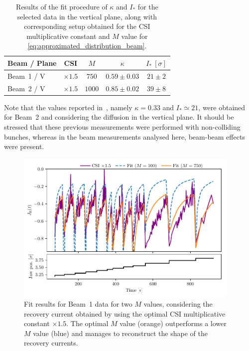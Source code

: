 %
\begin{table}[thp]
    \centering
    \begin{tabular}{lcccc}
        \toprule
        Beam / Plane & CSI & $M$ & $\kappa$ & $I_\ast\ [\sigma]$ \\
        \midrule
        Beam~1 / V & $\times1.5$ & $750$ & $0.59\pm0.03$ & $21\pm2$ \\
        Beam~2 / V & $\times1.5$ & $1000$ & $0.85\pm0.02$ & $39\pm8$ \\
        \bottomrule
    \end{tabular}
    \caption{Results of the fit procedure of $\kappa$ and $I_\ast$ for the selected data in the vertical plane, along with corresponding setup obtained for the CSI multiplicative constant and $M$ value for \eqref{eq:approximated_distribution_beam}.}
    \label{tab:fit_results}
\end{table}
%

Note that the values reported in~\cite{bazzani2020diffusion}, namely $\kappa=0.33 $ and $I_\ast \simeq 21$, were obtained for Beam~2 and considering the diffusion in the vertical plane. It should be stressed that these previous measurements were performed with non-colliding bunches, whereas in the beam measurements analysed here, beam-beam effects were present.

\begin{figure}[t]
    \centering
    \includegraphics[trim={0 2.5mm 0 3mm}, clip, width=0.95\textwidth]{5_Diffusion_measurement_LHC/figs/fifth.pdf}
    \caption{Fit results for Beam~1 data for two $M$ values, considering the recovery current obtained by using the optimal CSI multiplicative constant $\times 1.5$. The optimal $M$ value (orange) outperforms a lower $M$ value (blue) and manages to reconstruct the shape of the recovery currents.}
    \label{fig:fifth}
\end{figure}
%
